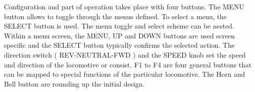 
Configuration and part of operation takes place with four buttons. The MENU button allows to toggle through the menus defined. To select a menu, the SELECT button is used. The menu toggle and select scheme can be nested. Within a menu screen, the MENU, UP and DOWN buttons are used screen specific and the SELECT button typically confirms the selected action. The direction switch ( REV-NEUTRAL-FWD ) and the SPEED knob set the speed and direction of the locomotive or consist. F1 to F4 are four general buttons that can be mapped to special functions of the particular locomotive. The Horn and Bell button are rounding up the initial design.